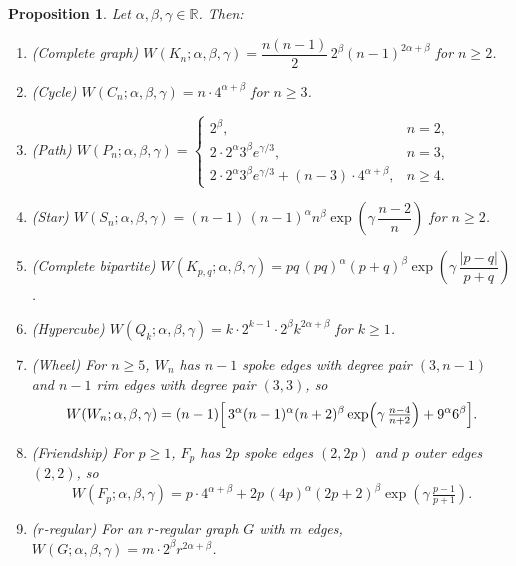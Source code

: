 \documentclass[a5paper, 10pt]{article}
\theoremstyle{plain}
\newtheorem{proposition}[theorem]{Proposition}
\theoremstyle{remark}
\theoremstyle{definition}
\newcommand{\Wuzi}{W(G;\alpha,\beta,\gamma)}
\begin{document}
\begin{proposition}\label{prop:closedforms}
Let $\alpha, \beta, \gamma \in \mathbb{R}$. Then:
\begin{enumerate}
\item (Complete graph) $W(K_n; \alpha, \beta, \gamma) =
  \dfrac{n(n-1)}{2}\,2^{\beta}(n - 1)^{2\alpha + \beta}$ for $n \ge 2$.
\item (Cycle) $W(C_n; \alpha, \beta, \gamma) = n \cdot 4^{\alpha + \beta}$
  for $n \ge 3$.
\item (Path)
  $W(P_n; \alpha, \beta, \gamma) =
  \begin{cases}
    2^{\beta}, & n = 2,\\[2pt]
    2 \cdot 2^{\alpha} 3^{\beta} e^{\gamma/3}, & n = 3,\\[2pt]
    2 \cdot 2^{\alpha} 3^{\beta} e^{\gamma/3} + (n - 3) \cdot 4^{\alpha + \beta},
       & n \ge 4.
  \end{cases}$
\item (Star) $W(S_n; \alpha, \beta, \gamma) =
  (n - 1)\,(n - 1)^{\alpha} n^{\beta} \exp\!\left(\gamma\,\dfrac{n - 2}{n}\right)$
  for $n \ge 2$.
\item (Complete bipartite) $W(K_{p,q}; \alpha, \beta, \gamma) =
  pq\,(pq)^{\alpha}(p + q)^{\beta}\exp\!\left(\gamma\,\dfrac{|p - q|}{p + q}\right)$.
\item (Hypercube) $W(Q_k; \alpha, \beta, \gamma) =
  k \cdot 2^{k - 1} \cdot 2^{\beta} k^{2\alpha + \beta}$ for $k \ge 1$.
\item (Wheel) For $n \ge 5$, $W_n$ has $n - 1$ spoke edges with
  degree pair $(3, n - 1)$ and $n - 1$ rim edges with degree pair
  $(3, 3)$, so
  \[
  W(W_n; \alpha, \beta, \gamma)
  = (n - 1)\Bigl[\,3^{\alpha} (n - 1)^{\alpha}(n + 2)^{\beta}
       \exp\!\left(\gamma\,\tfrac{n - 4}{n + 2}\right)
     + 9^{\alpha} 6^{\beta}\Bigr].
  \]
\item (Friendship) For $p \ge 1$, $F_p$ has $2p$ spoke edges
  $(2, 2p)$ and $p$ outer edges $(2, 2)$, so
  \[
  W(F_p; \alpha, \beta, \gamma)
  = p \cdot 4^{\alpha + \beta}
   + 2p\,(4p)^{\alpha}(2p + 2)^{\beta}
       \exp\!\left(\gamma\,\tfrac{p - 1}{p + 1}\right).
  \]
\item ($r$-regular) For an $r$-regular graph $G$ with $m$ edges,
  $\Wuzi = m \cdot 2^{\beta} r^{2\alpha + \beta}$.
\end{enumerate}
\end{proposition}
\end{document}
